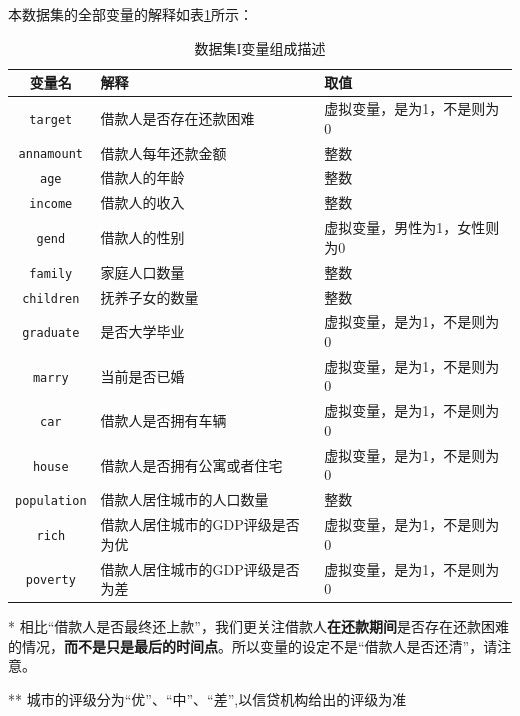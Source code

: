 \documentclass[13.5pt,hyperref,a4paper,UTF8]{ctexart}
\begin{document}
本数据集的全部变量的解释如表\ref{数据集I变量组成描述}所示：
\begin{table}[!htbp]
    \setlength{\belowcaptionskip}{0.2cm}
    \centering
    \caption{数据集I变量组成描述}
    \begin{threeparttable}
    \begin{tabular}{c  | p{5cm} |p{7cm}}
    \hline
        \textbf{变量名} & \textbf{解释} & \textbf{取值} \\
        \hline
        \texttt{target}  & 借款人是否存在还款困难\tnote{*}  &虚拟变量，是为1，不是则为0 \\
         \texttt{annamount}  & 借款人每年还款金额 &整数 \\
        \texttt{age}  & 借款人的年龄 & 整数 \\
        \texttt{income}  & 借款人的收入 & 整数 \\
        \texttt{gend}  & 借款人的性别 & 虚拟变量，男性为1，女性则为0 \\
        \texttt{family}  & 家庭人口数量 & 整数 \\
        \texttt{children}  & 抚养子女的数量 & 整数 \\
        \texttt{graduate} & 是否大学毕业 & 虚拟变量，是为1，不是则为0\\
        \texttt{marry}  & 当前是否已婚 & 虚拟变量，是为1，不是则为0 \\
        \texttt{car}  & 借款人是否拥有车辆 & 虚拟变量，是为1，不是则为0\\
        \texttt{house}  & 借款人是否拥有公寓或者住宅 & 虚拟变量，是为1，不是则为0\\
        \texttt{population}  & 借款人居住城市的人口数量 & 整数\\
        \texttt{rich}  & 借款人居住城市的GDP评级是否为优\tnote{**} & 虚拟变量，是为1，不是则为0\\
        \texttt{poverty}  & 借款人居住城市的GDP评级是否为差\tnote{**} & 虚拟变量，是为1，不是则为0\\
        \hline
    \end{tabular}
    \label{数据集I变量组成描述}
     \begin{tablenotes}
        \footnotesize
        \item[*] 相比“借款人是否最终还上款”，我们更关注借款人\textbf{在还款期间}是否存在还款困难的情况，\textbf{而不是只是最后的时间点}。所以变量的设定不是“借款人是否还清”，请注意。
        \item[**] 城市的评级分为“优”、“中”、“差”,以信贷机构给出的评级为准  %

      \end{tablenotes}
    \end{threeparttable}
\end{table}
\end{document}
